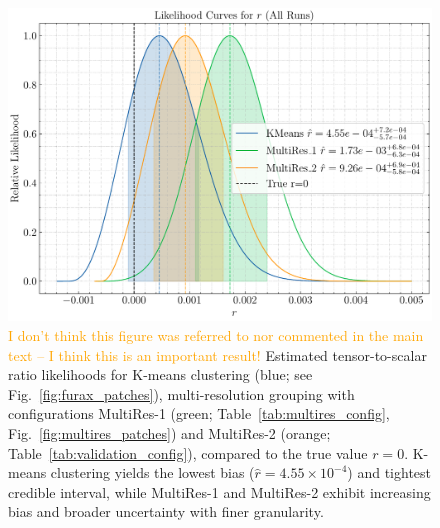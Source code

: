 \documentclass[fleqn,usenatbib]{mnras}
\newcommand{\je}[1]{\textcolor{orange}{#1}}
\begin{document}
\begin{figure}
    \centering
    \includegraphics[width=0.9\linewidth]{figures/r_likelihood_distribution.pdf}
    \caption{
    \je{I don't think this figure was referred to nor commented  in the main text -- I think this is an important result!}
    Estimated tensor-to-scalar ratio likelihoods for K-means clustering (blue; see Fig.~\protect\ref{fig:furax_patches}), multi-resolution grouping with configurations MultiRes-1 (green; Table~\protect\ref{tab:multires_config}, Fig.~\protect\ref{fig:multires_patches}) and MultiRes-2 (orange; Table~\protect\ref{tab:validation_config}), compared to the true value \( r = 0 \). 
    K-means clustering yields the lowest bias (\( \hat{r} = 4.55 \times 10^{-4} \)) and tightest credible interval, while MultiRes-1 and MultiRes-2 exhibit increasing bias and broader uncertainty with finer granularity. 
    }
    
    \label{fig:r_likelihood_distribution}
\end{figure}
\end{document}
